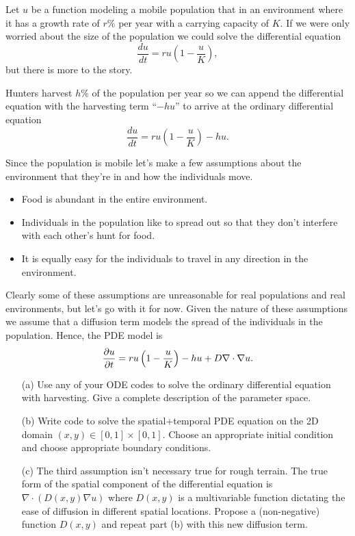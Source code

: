 \begin{problem}
    Let $u$ be a function modeling a mobile population that in an environment where it has a growth rate of
    $r\%$ per year with a carrying capacity of $K$.  If we were only worried about the
    size of the population we could solve the differential equation 
    \[ \frac{du}{dt} = ru \left( 1-\frac{u}{K} \right), \]
    but there is more to the story.  
    
    Hunters harvest $h$\% of the population per year so we can append the differential
    equation with the harvesting term ``$-h u$'' to arrive at the ordinary differential
    equation 
    \[ \frac{du}{dt} = ru \left( 1-\frac{u}{K} \right) - hu. \]

    Since the population is mobile let's make a few assumptions about the environment that
    they're in and how the individuals move.
    \begin{itemize}
        \item Food is abundant in the entire environment.
        \item Individuals in the population like to spread out so that they don't
            interfere with each other's hunt for food.
        \item It is equally easy for the individuals to travel in any direction in the
            environment.
    \end{itemize}
    Clearly some of these assumptions are unreasonable for real populations and real
    environments, but let's go with it for now.  Given the nature of these assumptions we
    assume that a diffusion term models the spread of the individuals in the population.
    Hence, the PDE model is
    \[ \frac{\partial{u}}{\partial{t}} = ru\left( 1-\frac{u}{K} \right) - hu + D \nabla \cdot \nabla u. \]
    \begin{enumerate}
        \item[(a)] Use any of your ODE codes to solve the ordinary differential equation
            with harvesting.  Give a complete description of the parameter space.
        \item[(b)] Write code to solve the spatial+temporal PDE equation on the 2D domain
            $(x,y) \in [0,1] \times [0,1]$.  Choose an appropriate initial condition and
            choose appropriate boundary conditions.
        \item[(c)] The third assumption isn't necessary true for rough terrain. The true
            form of the spatial component of the differential equation is $\nabla \cdot
            \left( D(x,y) \nabla u \right)$ where $D(x,y)$ is a multivariable function
            dictating the ease of diffusion in different spatial locations.  Propose a
            (non-negative) function $D(x,y)$ and repeat part (b) with this new diffusion
            term.
    \end{enumerate}
\end{problem}


